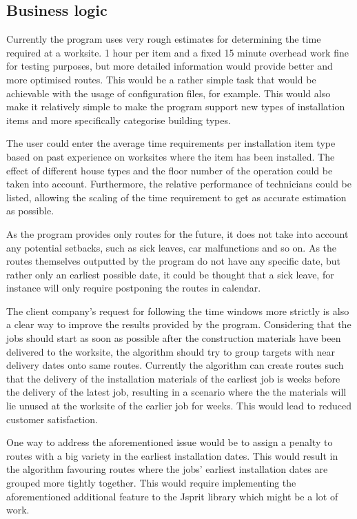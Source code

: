 \subsection{Business logic}

Currently the program uses very rough estimates for determining the time required at a worksite. 1 hour per item and a fixed 15 minute overhead work fine for testing purposes, but more detailed information would provide better and more optimised routes. This would be a rather simple task that would be achievable with the usage of configuration files, for example. This would also make it relatively simple to make the program support new types of installation items and more specifically categorise building types.

The user could enter the average time requirements per installation item type based on past experience on worksites where the item has been installed. The effect of different house types and the floor number of the operation could be taken into account. Furthermore, the relative performance of technicians could be listed, allowing the scaling of the time requirement to get as accurate estimation as possible.

As the program provides only routes for the future, it does not take into account any potential setbacks, such as sick leaves, car malfunctions and so on. As the routes themselves outputted by the program do not have any specific date, but rather only an earliest possible date, it could be thought that a sick leave, for instance will only require postponing the routes in calendar.  

The client company's request for following the time windows more strictly is also a clear way to improve the results provided by the program. Considering that the jobs should start as soon as possible after the construction materials have been delivered to the worksite, the algorithm should try to group targets with near delivery dates onto same routes. Currently the algorithm can create routes such that the delivery of the installation materials of the earliest job is weeks before the delivery of the latest job, resulting in a scenario where the the materials will lie  unused at the worksite of the earlier job for weeks. This would lead to reduced customer satisfaction.

One way to address the aforementioned issue would be to assign a penalty to routes with a big variety in the earliest installation dates. This would result in the algorithm favouring routes where the jobs' earliest installation dates are grouped more tightly together. This would require implementing the aforementioned additional feature to the Jsprit library which might be a lot of work. 

